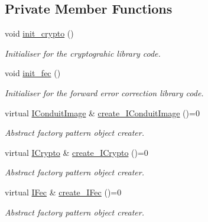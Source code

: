 \subsection*{Private Member Functions}
\begin{DoxyCompactItemize}
\item 
void \hyperlink{classefb_1_1ICore_a758885d8fdb1b308587b2500df48b8ac}{init\_\-crypto} ()
\begin{DoxyCompactList}\small\item\em Initialiser for the cryptograhic library code. \item\end{DoxyCompactList}\item 
void \hyperlink{classefb_1_1ICore_a0b17fb5c4682b0e0a3aa266596759368}{init\_\-fec} ()
\begin{DoxyCompactList}\small\item\em Initialiser for the forward error correction library code. \item\end{DoxyCompactList}\item 
virtual \hyperlink{classefb_1_1IConduitImage}{IConduitImage} \& \hyperlink{classefb_1_1ICore_affa3abf2e0b92c8710a31cec5184e893}{create\_\-IConduitImage} ()=0
\begin{DoxyCompactList}\small\item\em Abstract factory pattern object creater. \item\end{DoxyCompactList}\item 
virtual \hyperlink{classefb_1_1ICrypto}{ICrypto} \& \hyperlink{classefb_1_1ICore_a4c27ca4eb5d68a4b509c74572a3b2d48}{create\_\-ICrypto} ()=0
\begin{DoxyCompactList}\small\item\em Abstract factory pattern object creater. \item\end{DoxyCompactList}\item 
virtual \hyperlink{classefb_1_1IFec}{IFec} \& \hyperlink{classefb_1_1ICore_a0f65d448a5b036921f1ddb9c00f7f5e2}{create\_\-IFec} ()=0
\begin{DoxyCompactList}\small\item\em Abstract factory pattern object creater. \item\end{DoxyCompactList}\end{DoxyCompactItemize}
